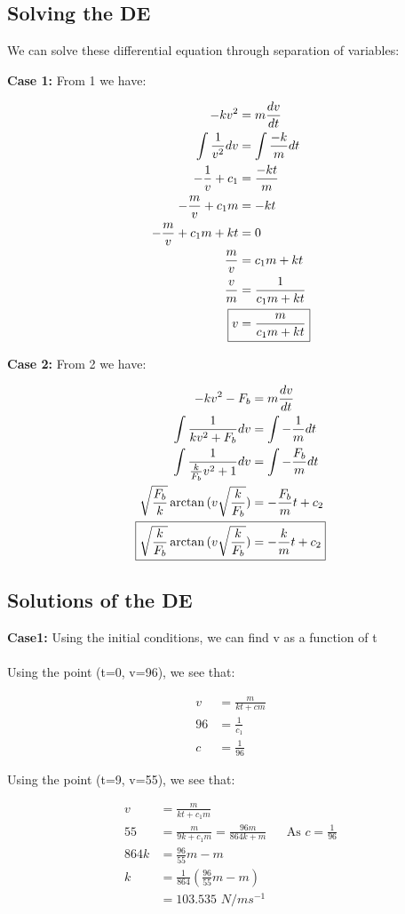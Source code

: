 \subsection{Solving the DE}
We can solve these differential equation through separation of variables:

\textbf{Case 1: }
From 1 we have:

\begin{align*}
    -kv^2 &= m \frac{dv}{dt}
    \\ \int \frac{1}{v^2} dv &= \int \frac{-k}{m} dt
    \\ -\frac{1}{v} + c_1 &= \frac{-kt}{m}
    \\ -\frac{m}{v} + c_{1}m &= -kt
    \\ -\frac{m}{v} + c_{1}m + kt &=0
    \\ \frac{m}{v} &= c_{1}m + kt
    \\ \frac{v}{m} &= \frac{1}{c_{1}m+kt}
    \\ \Aboxed{v &= \frac{m}{c_{1}m+kt}}
\end{align*}

\textbf{Case 2:}
From 2 we have: 

\begin{align*}
    -kv^2 - F_b &= m \frac{dv}{dt}
    \\ \int \frac{1}{kv^2 + F_b} dv &= \int -\frac{1}{m} dt
    \\  \int \frac{1}{\frac{k}{F_b}v^2 + 1} dv &= \int -\frac{F_b}{m} dt
    \\ \sqrt{\frac{F_b}{k}} \arctan{(v\sqrt{\frac{k}{F_b}})} &= -\frac{F_b}{m}t + c_2
    \\ \Aboxed{\sqrt{\frac{k}{F_b}} \arctan{(v\sqrt{\frac{k}{F_b}})} &= -\frac{k}{m}t + c_2}
\end{align*}

\subsection{Solutions of the DE}
\textbf{Case1: } 
Using the initial conditions, we can find v as a function of t
\\ \\
Using the point (t=0, v=96), we see that:
\begin{center}
\begin{align*}
    v &= \frac{m}{kt+cm}
    \\ 96 &= \frac{1}{c_1}
    \\ c &= \frac{1}{96}
\end{align*}
\end{center}
Using the point (t=9, v=55), we see that:
\begin{center}
\begin{align*}
    v &= \frac{m}{kt+c_1m}
    \\ 55 &= \frac{m}{9k + c_1m} = \frac{96m}{864k + m} && \text{As $c=\frac{1}{96}$}
    \\ 864k &= \frac{96}{55}m - m
    \\ k &= \frac{1}{864}(\frac{96}{55}m - m)
    \\ &= \text{103.535 $N/ms^{-1}$}
\end{align*}
\end{center}

